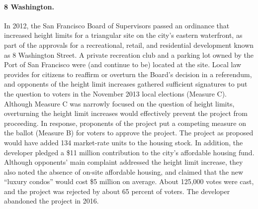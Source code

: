 \documentclass[article,11pt]{memoir}
\begin{document}
\paragraph{8 Washington.} In 2012, the San Francisco Board of Supervisors passed an ordinance that increased height limits for a triangular site on the city's eastern waterfront, as part of the approvals for a recreational, retail, and residential development known as 8 Washington Street. A private recreation club and a parking lot owned by the Port of San Francisco were (and continue to be) located at the site. Local law provides for citizens to reaffirm or overturn the Board's decision in a referendum, and opponents of the height limit increases gathered sufficient signatures to put the question to voters in the November 2013 local elections (Measure C). Although Measure C was narrowly focused on the question of height limits, overturning the height limit increases would effectively prevent the project from proceeding. In response, proponents of the project put a competing measure on the ballot (Measure B) for voters to approve the project.  The project as proposed would have added 134 market-rate units to the housing stock. In addition, the developer pledged a \$11 million contribution to the city's affordable housing fund. Although opponents' main complaint addressed the height limit increase, they also noted the absence of on-site affordable housing, and claimed that the new ``luxury condos'' would cost \$5 million on average.  About 125,000 votes were cast, and the project was rejected by about 65 percent of voters. The developer abandoned the project in 2016.
\end{document}

